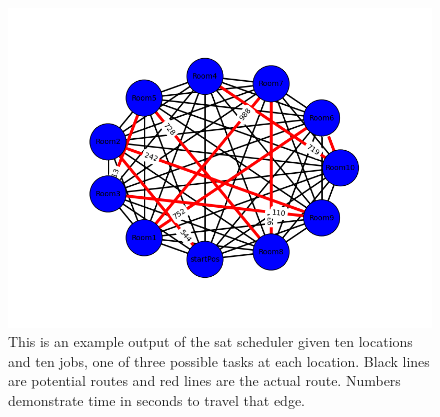 \documentclass{article}
\begin{document}
\begin{figure}
\centering
\includegraphics[width=1.0\textwidth]{Ten_Task_Result.png}
\caption{\label{fig:TenTaskResult}This is an example output of the sat scheduler given ten locations and ten jobs, one of three possible tasks at each location. Black lines are potential routes and red lines are the actual route. Numbers demonstrate time in seconds to travel that edge.}
\end{figure}
\end{document}
